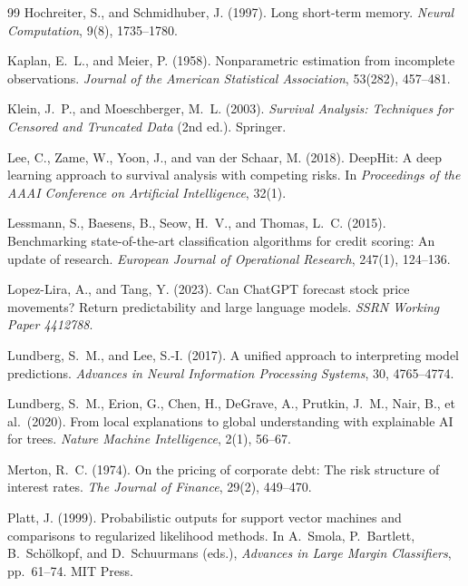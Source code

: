 \documentclass[12pt,a4paper]{article}
\begin{document}
\begin{thebibliography}{99}
Hochreiter, S., and Schmidhuber, J. (1997).
Long short-term memory.
\textit{Neural Computation}, 9(8), 1735--1780.

Kaplan, E.~L., and Meier, P. (1958).
Nonparametric estimation from incomplete observations.
\textit{Journal of the American Statistical Association}, 53(282), 457--481.

Klein, J.~P., and Moeschberger, M.~L. (2003).
\textit{Survival Analysis: Techniques for Censored and Truncated Data}
(2nd ed.).
Springer.

Lee, C., Zame, W., Yoon, J., and van der Schaar, M. (2018).
DeepHit: A deep learning approach to survival analysis with competing risks.
In \textit{Proceedings of the AAAI Conference on Artificial Intelligence},
32(1).

Lessmann, S., Baesens, B., Seow, H.~V., and Thomas, L.~C. (2015).
Benchmarking state-of-the-art classification algorithms for credit scoring:
An update of research.
\textit{European Journal of Operational Research}, 247(1), 124--136.

Lopez-Lira, A., and Tang, Y. (2023).
Can ChatGPT forecast stock price movements? Return predictability and
large language models.
\textit{SSRN Working Paper 4412788}.

Lundberg, S.~M., and Lee, S.-I. (2017).
A unified approach to interpreting model predictions.
\textit{Advances in Neural Information Processing Systems}, 30, 4765--4774.

Lundberg, S.~M., Erion, G., Chen, H., DeGrave, A., Prutkin, J.~M.,
Nair, B., et al.\ (2020).
From local explanations to global understanding with explainable AI for trees.
\textit{Nature Machine Intelligence}, 2(1), 56--67.

Merton, R.~C. (1974).
On the pricing of corporate debt: The risk structure of interest rates.
\textit{The Journal of Finance}, 29(2), 449--470.

Platt, J. (1999).
Probabilistic outputs for support vector machines and comparisons to
regularized likelihood methods.
In A.~Smola, P.~Bartlett, B.~Schölkopf, and D.~Schuurmans (eds.),
\textit{Advances in Large Margin Classifiers}, pp.\ 61--74.
MIT Press.


\end{thebibliography}
\end{document}
